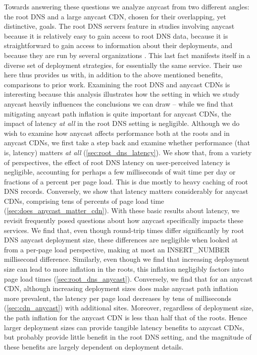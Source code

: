 \documentclass[sigconf,nonacm,10pt]{acmart}
\begin{document}
Towards answering these questions we analyze anycast from two different
angles: the root DNS and a large anycast CDN, chosen for their
overlapping, yet distinctive, goals. The root DNS servers feature in
studies involving anycast because it is relatively easy to gain access
to root DNS data, because it is straightforward to gain access to
information about their deployments, and because they are run by several
organizations \cite{root_servers}. This last fact manifests itself in a
diverse set of deployment strategies, for essentially the same service.
Their use here thus provides us with, in addition to the above mentioned
benefits, comparisons to prior work. Examining the root DNS and anycast
CDNs is interesting because this analysis illustrates how the setting in
which we study anycast heavily influences the conclusions we can draw --
while we find that mitigating anycast path inflation is quite important
for anycast CDNs, the impact of latency \textit{at all} in the root DNS
setting is negligible. \break \break
Although we do wish to examine how anycast affects performance both at
the roots and in anycast CDNs, we first take a step back and examine
whether performance (that is, latency) matters \textit{at all}
(\autoref{sec:root_dns_latency}). We show that, from a variety of
perspectives, the effect of root DNS latency on user-perceived latency
is negligible, accounting for perhaps a few milliseconds of wait time
per day or fractions of a percent per page load. This is due mostly to
heavy caching of root DNS records. Conversely, we show that latency
matters considerably for anycast CDNs, comprising tens of percents of
page load time (\autoref{sec:does_anycast_matter_cdn}). \break
With these basic results about latency, we revisit frequently posed
questions about how anycast specifically impacts these services. We find
that, even though round-trip times differ significantly by root DNS
anycast deployment size, these differences are negligible when looked at
from a per-page load perspective, making at most an INSERT\_NUMBER
millisecond difference. Similarly, even though we find that increasing
deployment size can lead to more inflation in the roots, this inflation
negligibly factors into page load times
(\autoref{sec:root_dns_anycast}). Conversely, we find that for an
anycast CDN, although increasing deployment sizes does make anycast path
inflation more prevalent, the latency per page load decreases by tens of
milliseconds (\autoref{sec:cdn_anycast}) with additional sites.
Moreover, regardless of deployment size, the path inflation for the
anycast CDN is less than half that of the roots. Hence larger deployment
sizes can provide tangible latency benefits to anycast CDNs, but
probably provide little benefit in the root DNS setting, and the
magnitude of these benefits are largely dependent on deployment details.
\end{document}

